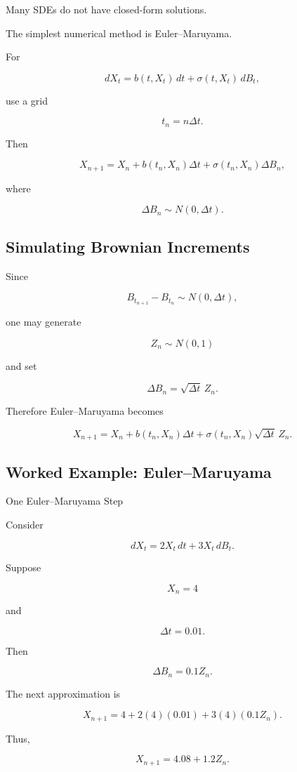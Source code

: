 Many SDEs do not have closed-form solutions.

The simplest numerical method is Euler--Maruyama.

For

\[
dX_t
=
b(t,X_t)\,dt
+
\sigma(t,X_t)\,dB_t,
\]

use a grid

\[
t_n=n\Delta t.
\]

Then

\[
\boxed{
X_{n+1}
=
X_n
+
b(t_n,X_n)\Delta t
+
\sigma(t_n,X_n)\Delta B_n,
}
\]

where

\[
\boxed{
\Delta B_n
\sim
N(0,\Delta t).
}
\]

\subsection{Simulating Brownian Increments}
\label{subsec:simulate-brownian-increments}

Since

\[
B_{t_{n+1}}-B_{t_n}
\sim
N(0,\Delta t),
\]

one may generate

\[
Z_n\sim N(0,1)
\]

and set

\[
\boxed{
\Delta B_n
=
\sqrt{\Delta t}\,Z_n.
}
\]

Therefore Euler--Maruyama becomes

\[
\boxed{
X_{n+1}
=
X_n
+
b(t_n,X_n)\Delta t
+
\sigma(t_n,X_n)\sqrt{\Delta t}\,Z_n.
}
\]

\subsection{Worked Example: Euler--Maruyama}
\label{subsec:worked-euler-maruyama}

\begin{workedexamplebox}{One Euler--Maruyama Step}

Consider

\[
dX_t
=
2X_t\,dt
+
3X_t\,dB_t.
\]

Suppose

\[
X_n=4
\]

and

\[
\Delta t=0.01.
\]

Then

\[
\Delta B_n
=
0.1Z_n.
\]

The next approximation is

\[
X_{n+1}
=
4
+
2(4)(0.01)
+
3(4)(0.1Z_n).
\]

Thus,

\begin{answerbox}
\[
\boxed{
X_{n+1}
=
4.08
+
1.2Z_n.
}
\]
\end{answerbox}

\end{workedexamplebox}

